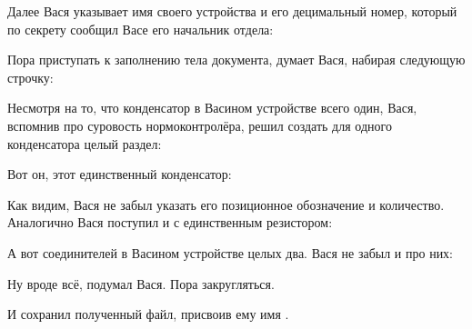 \begin{pcbdoccode}
\end{pcbdoccode}

Далее Вася указывает имя своего устройства и его децимальный номер, который
по секрету сообщил Васе его начальник отдела:

\begin{pcbdoccode}
\end{pcbdoccode}

Пора приступать к заполнению тела документа, думает Вася, набирая следующую
строчку:

\begin{pcbdoccode}

\end{pcbdoccode}

Несмотря на то, что конденсатор в Васином устройстве всего один, Вася, вспомнив
про суровость нормоконтролёра,  решил создать для одного конденсатора целый
раздел:

\begin{pcbdoccode}
\end{pcbdoccode}

Вот он, этот единственный конденсатор:

\begin{pcbdoccode}
\end{pcbdoccode}

Как видим, Вася не забыл указать его позиционное обозначение и
количество. Аналогично Вася поступил и с единственным резистором:

\begin{pcbdoccode}
\end{pcbdoccode}

А вот соединителей в Васином устройстве целых два. Вася не забыл и про них:

\begin{pcbdoccode}
\end{pcbdoccode}

Ну вроде всё, подумал Вася. Пора закругляться.

\begin{pcbdoccode}

\end{pcbdoccode}

И сохранил полученный файл, присвоив ему имя .

